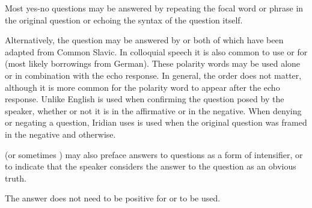 Most yes-no questions may be answered by repeating the focal word or phrase in
the original question or echoing the syntax of the question itself.

\ex
{}
\xe

Alternatively, the question may be answered by  or 
both of which have been adapted from Common Slavic. In
colloquial speech it is also common to use  or  for 
(most likely borrowings from German). These polarity words may be
used alone or in combination with the echo response. In general, the order does
not matter, although it is more common for the polarity word to appear after the
echo response. Unlike English   is used when confirming the
question posed by the speaker, whether or not it is in the affirmative or in the
negative. When denying or negating a question, Iridian uses  is used
when the original question was framed in the negative and  otherwise.

\ex
{}\xe

\ex{}
\xe

 (or sometimes ) may also preface answers to questions as a
form of intensifier, or to indicate that the speaker considers the answer to the
question as an obvious truth.

\ex
{}\xe

The answer does not need to be positive for  or  to be used.

